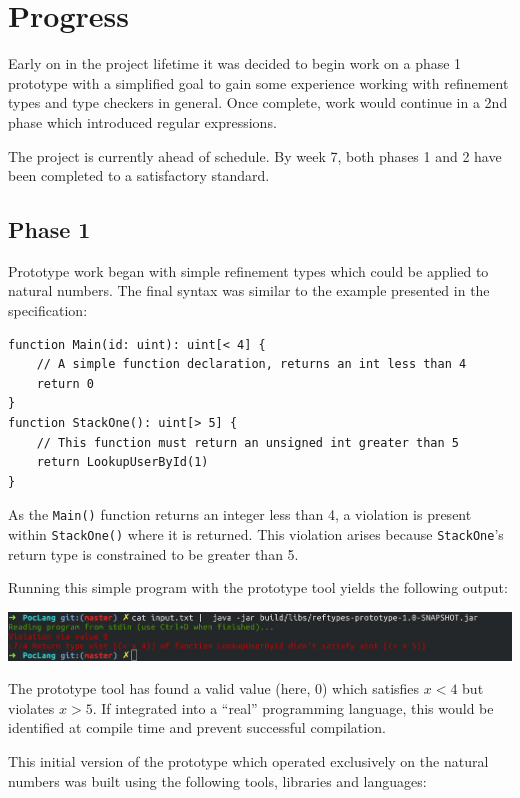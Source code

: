 \documentclass[a4paper]{article}
\newcommand{\termbox}[1] {\colorbox{termbg}{\parbox{\textwidth}{\vspace{.75\baselineskip}\centering\parbox{0.95\textwidth}{ \sffamily#1\vspace{.75\baselineskip}}}}}
\begin{document}
    \section{Progress}
    
    Early on in the project lifetime it was decided to begin work on a phase 1 prototype with a simplified goal to gain some experience working with refinement types and type checkers in general. Once complete, work would continue in a 2nd phase which introduced regular expressions.
    
    The project is currently ahead of schedule. By week 7, both phases 1 and 2 have been completed to a satisfactory standard.
    
    \subsection*{Phase 1}
    
    Prototype work began with simple refinement types which could be applied to natural numbers. The final syntax was similar to the example presented in the specification:
    
    \begin{verbatim}
function Main(id: uint): uint[< 4] {
    // A simple function declaration, returns an int less than 4
    return 0
}
function StackOne(): uint[> 5] {
    // This function must return an unsigned int greater than 5
    return LookupUserById(1)
}
    \end{verbatim}
    
    As the \texttt{Main()} function returns an integer less than 4, a violation is present within \texttt{StackOne()} where it is returned. This violation arises because \texttt{StackOne}'s return type is constrained to be greater than 5.
    
    Running this simple program with the prototype tool yields the following output:
    

    \termbox{\includegraphics[width=\linewidth]{term1}}
    
    The prototype tool has found a valid value (here, $0$) which satisfies $x < 4$ but violates $x > 5$. If integrated into a ``real'' programming language, this would be identified at compile time and prevent successful compilation.
    
    This initial version of the prototype which operated exclusively on the natural numbers was built using the following tools, libraries and languages:
    
\end{document}
